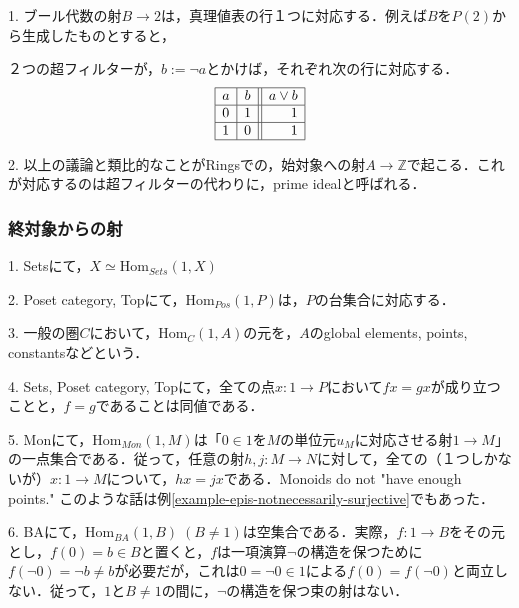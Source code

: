 \documentclass[uplatex, 12pt, dvipdfmx]{jsarticle}
\begin{document}
\begin{remark*}
    1. ブール代数の射$B\to 2$は，真理値表の行１つに対応する．例えば$B$を$P(2)$から生成したものとすると，
    \begin{center}
    \end{center}
    ２つの超フィルターが，$b:=\lnot a$とかけば，それぞれ次の行に対応する．
    \[\begin{array}{|l|c||r|}\hline
            a & b & a\lor b  \\ \hline
            0 & 1 & 1  \\\hline
            1 & 0 & 1  \\ \hline
    \end{array}\]

    2. 以上の議論と類比的なことがRingsでの，始対象への射$A\to\mathbb{Z}$で起こる．これが対応するのは超フィルターの代わりに，prime idealと呼ばれる．
\end{remark*}

\subsubsection*{終対象からの射}

\begin{example}
    1. Setsにて，$X\simeq\mathrm{Hom}_{Sets}(1,X)$

    2. Poset category, Topにて，$\mathrm{Hom}_{Pos}(1,P)$は，$P$の台集合に対応する．

    3. 一般の圏$C$において，$\mathrm{Hom}_C(1,A)$の元を，$A$のglobal elements, points, constantsなどという．

    4. Sets, Poset category, Topにて，全ての点$x:1\to P$において$fx=gx$が成り立つことと，$f=g$であることは同値である．

    5. Monにて，$\mathrm{Hom}_{Mon}(1,M)$は「$0\in 1$を$M$の単位元$u_M$に対応させる射$1\to M$」の一点集合である．従って，任意の射$h,j:M\to N$に対して，全ての（１つしかないが）$x:1\to M$について，$hx=jx$である．Monoids do not "have enough points."
    このような話は例\ref{example-epis-notnecessarily-surjective}でもあった．

    6. BAにて，$\mathrm{Hom}_{BA}(1,B)\; (B\ne 1)$は空集合である．実際，$f:1\to B$をその元とし，$f(0)=b\in B$と置くと，$f$は一項演算$\lnot$の構造を保つために$f(\lnot 0)=\lnot b\ne b$が必要だが，これは$0=\lnot 0\in 1$による$f(0)=f(\lnot 0)$と両立しない．従って，$1$と$B\ne 1$の間に，$\lnot$の構造を保つ束の射はない．
\end{example}
\end{document}

